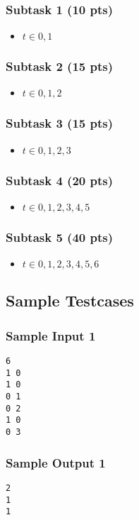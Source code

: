 \subsubsection{Subtask 1 (10 pts)}\label{subtask-1}
\begin{itemize}
\item $t\in 0, 1$
\end{itemize}

\subsubsection{Subtask 2 (15 pts)}\label{subtask-2}
\begin{itemize}
\item $t\in 0, 1, 2$
\end{itemize}

\subsubsection{Subtask 3 (15 pts)}\label{subtask-3}
\begin{itemize}
\item $t\in 0, 1, 2, 3$
\end{itemize}

\subsubsection{Subtask 4 (20 pts)}\label{subtask-4}
\begin{itemize}
\item $t\in 0, 1, 2, 3, 4, 5$
\end{itemize}

\subsubsection{Subtask 5 (40 pts)}\label{subtask-5}
\begin{itemize}
\item $t\in 0, 1, 2, 3, 4, 5, 6$
\end{itemize}

\subsection{Sample Testcases}\label{sample-testcases}

\begin{multicols}{2}
\subsubsection{Sample Input 1}\label{sample-input-1}
\begin{verbatim}
6
1 0
1 0
0 1
0 2
1 0
0 3
\end{verbatim}

\columnbreak

\subsubsection{Sample Output 1}\label{sample-output-1}
\begin{verbatim}
2
1
1
\end{verbatim}
\end{multicols}

